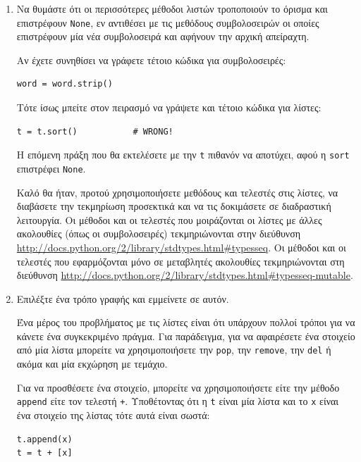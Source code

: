 \documentclass[10pt]{book}
\begin{document}
\begin{enumerate}

\item  Να θυμάστε ότι οι περισσότερες μέθοδοι λιστών τροποποιούν το όρισμα και επιστρέφουν {\tt None}, εν αντιθέσει με τις μεθόδους συμβολοσειρών οι οποίες επιστρέφουν μία νέα συμβολοσειρά και αφήνουν την αρχική απείραχτη.
  
Αν έχετε συνηθίσει να γράφετε τέτοιο κώδικα για συμβολοσειρές:  

\begin{verbatim}
word = word.strip()
\end{verbatim}

Τότε ίσως μπείτε στον πειρασμό να γράψετε και τέτοιο κώδικα για λίστες:

\begin{verbatim}
t = t.sort()           # WRONG!
\end{verbatim}

Η επόμενη πράξη που θα εκτελέσετε με την {\tt t} πιθανόν να αποτύχει, αφού η {\tt sort} επιστρέφει {\tt None}.

Καλό θα ήταν, προτού χρησιμοποιήσετε μεθόδους και τελεστές στις λίστες, να διαβάσετε την τεκμηρίωση προσεκτικά και να τις δοκιμάσετε σε διαδραστική λειτουργία. Οι μέθοδοι και οι τελεστές που μοιράζονται οι λίστες με άλλες ακολουθίες (όπως οι συμβολοσειρές) τεκμηριώνονται στην διεύθυνση \url{http://docs.python.org/2/library/stdtypes.html#typesseq}. Οι μέθοδοι και οι τελεστές που εφαρμόζονται μόνο σε μεταβλητές ακολουθίες τεκμηριώνονται στη διεύθυνση  \url{http://docs.python.org/2/library/stdtypes.html#typesseq-mutable}.


\item  Επιλέξτε ένα τρόπο γραφής και εμμείνετε σε αυτόν.

Ένα μέρος του προβλήματος με τις λίστες είναι ότι υπάρχουν πολλοί τρόποι για να κάνετε ένα συγκεκριμένο πράγμα. Για παράδειγμα, για να αφαιρέσετε ένα στοιχείο από μία λίστα μπορείτε να χρησιμοποιήσετε την {\tt pop}, την {\tt remove}, την  {\tt del} ή ακόμα και μία εκχώρηση με τεμάχιο.

Για να προσθέσετε ένα στοιχείο, μπορείτε να χρησιμοποιήσετε είτε την μέθοδο {\tt append} είτε τον τελεστή {\tt +}. Υποθέτοντας ότι η {\tt t} είναι μία λίστα και το {\tt x} είναι ένα στοιχείο της λίστας τότε αυτά είναι σωστά:

\begin{verbatim}
t.append(x)
t = t + [x]
\end{verbatim}


\end{enumerate}
\end{document}
